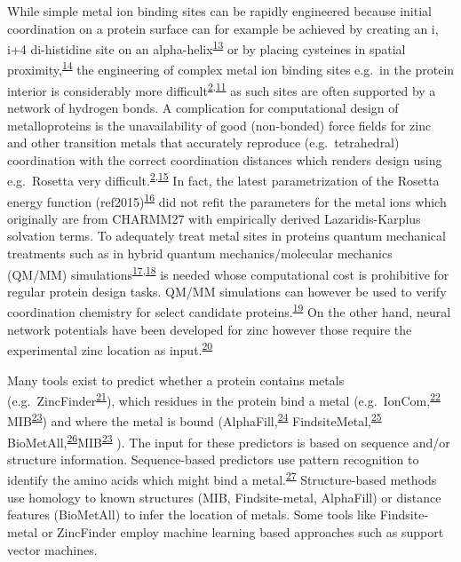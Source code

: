 \documentclass[  ASAPversion,
  ,
  9pt]{elife}
\begin{document}
While simple metal ion binding sites can be rapidly engineered because initial coordination on a protein surface can for example be achieved by creating an i, i+4 di-histidine site on an alpha-helix\textsuperscript{\protect\hyperlink{ref-io987fKE}{13}} or by placing cysteines in spatial proximity,\textsuperscript{\protect\hyperlink{ref-JXKFLH3I}{14}} the engineering of complex metal ion binding sites e.g.~in the protein interior is considerably more difficult\textsuperscript{\protect\hyperlink{ref-LY9UGI7}{2},\protect\hyperlink{ref-Lj2sbjzc}{11}} as such sites are often supported by a network of hydrogen bonds. A complication for computational design of metalloproteins is the unavailability of good (non-bonded) force fields for zinc and other transition metals that accurately reproduce (e.g.~tetrahedral) coordination with the correct coordination distances which renders design using e.g.~Rosetta very difficult.\textsuperscript{\protect\hyperlink{ref-LY9UGI7}{2},\protect\hyperlink{ref-1FR3e6DyA}{15}} In fact, the latest parametrization of the Rosetta energy function (ref2015)\textsuperscript{\protect\hyperlink{ref-1uPiiMnD}{16}} did not refit the parameters for the metal ions which originally are from CHARMM27 with empirically derived Lazaridis-Karplus solvation terms. To adequately treat metal sites in proteins quantum mechanical treatments such as in hybrid quantum mechanics/molecular mechanics (QM/MM) simulations\textsuperscript{\protect\hyperlink{ref-5Vxh8hay}{17},\protect\hyperlink{ref-IXq7vmo3}{18}} is needed whose computational cost is prohibitive for regular protein design tasks. QM/MM simulations can however be used to verify coordination chemistry for select candidate proteins.\textsuperscript{\protect\hyperlink{ref-nlfa683y}{19}} On the other hand, neural network potentials have been developed for zinc however those require the experimental zinc location as input.\textsuperscript{\protect\hyperlink{ref-b5EJeHX3}{20}}

Many tools exist to predict whether a protein contains metals (e.g.~ZincFinder\textsuperscript{\protect\hyperlink{ref-qNdK0F1w}{21}}), which residues in the protein bind a metal (e.g.~IonCom,\textsuperscript{\protect\hyperlink{ref-KNmKWbrP}{22}} MIB\textsuperscript{\protect\hyperlink{ref-1HMhB3vxM}{23}}) and where the metal is bound (AlphaFill,\textsuperscript{\protect\hyperlink{ref-13fLqNwbD}{24}} FindsiteMetal,\textsuperscript{\protect\hyperlink{ref-W4f7UG1p}{25}} BioMetAll,\textsuperscript{\protect\hyperlink{ref-iHxzzTCG}{26}}MIB\textsuperscript{\protect\hyperlink{ref-1HMhB3vxM}{23}} ). The input for these predictors is based on sequence and/or structure information. Sequence-based predictors use pattern recognition to identify the amino acids which might bind a metal.\textsuperscript{\protect\hyperlink{ref-13sNVOrHB}{27}}
Structure-based methods use homology to known structures (MIB, Findsite-metal, AlphaFill) or distance features (BioMetAll) to infer the location of metals. Some tools like Findsite-metal or ZincFinder employ machine learning based approaches such as support vector machines.
\end{document}
